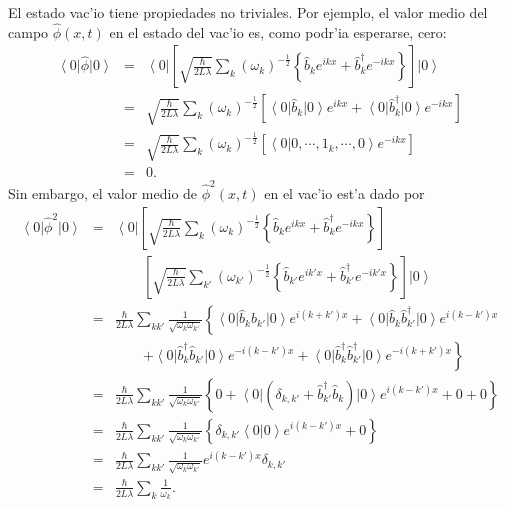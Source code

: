 El estado vac'io tiene propiedades no triviales. Por ejemplo, el valor medio del
campo $\hat{\phi}(x,t) $ en el estado del
vac'io es, como podr'ia esperarse, cero:
\begin{eqnarray}
\left< 0\right| \hat{\phi}\left| 0\right> & = &\left<
0\right| \left[ \sqrt{\frac{\hbar}{2L\lambda}}\sum_k\left( \omega
_k\right) ^{-\frac{1}{2}}\left\{ \hat{b}_k e^{ikx}+\hat{b}_k^\dagger  e^{-ikx}\right\} \right] \left|
0\right> \\
& = &\sqrt{\frac{\hbar}{2L\lambda}}\sum_k\left( \omega_k\right) ^{-\frac
{1}{2}}\left[ \left< 0\right| \hat{b}_k\left| 0\right> e^{ikx}+\left< 0\right|
\hat{b}_k^\dagger  \left| 0\right> e^{-ikx}\right] \\
& = &\sqrt{\frac{\hbar}{2L\lambda}}\sum_k\left( \omega_k\right) ^{-\frac
{1}{2}}\left[ \left< 0\right| \left. 0,\cdots, 1_k, \cdots,0\right> e^{-ikx}
\right] \\
& = &0 .
\end{eqnarray}
Sin embargo, el valor medio de $\hat{\phi}^{2}(x,t) $ en el vac'io est'a dado
por
\begin{eqnarray}
\left< 0\right| \hat{\phi}^{2}\left| 0\right> &=&
\left< 0\right| \left[ \sqrt{\frac{\hbar}{2L\lambda}}\sum_k\left(
\omega_k\right)^{-\frac{1}{2}}\left\{\hat{b}_ke^{ikx}
+\hat{b}_k^\dagger e^{-ikx}\right\} \right] \\
&& \qquad\left[ \sqrt{\frac{\hbar}{2L\lambda}}\sum_{k'}\left( \omega_{k'}\right)
^{-\frac{1}{2}}\left\{
\hat{b}_{k'}e^{ik'x}+\hat{b}_{k'}^\dagger e^{-ik'x}\right\} \right] \left|
0\right> \\
& = &\frac{\hbar}{2L\lambda}\sum_{kk'}\frac{1}{\sqrt{\omega_k\omega_{k'}}}
\left\{\left< 0\right| \hat{b}_k\hat{b}_{k'}\left| 0\right> e^{i\left(
k+k'\right) x}
+\left< 0\right| \hat{b}_k\hat{b}_{k'}^\dagger \left| 0\right>
e^{i(k-k')x}\right. \nonumber \\
&&\qquad\left.+\left< 0\right| \hat{b}_k^\dagger \hat{b}_{k'}\left| 0\right>
e^{-i(k-k')x}+\left< 0\right| \hat{b}_k^\dagger \hat{b}_{k'}^\dagger \left|
0\right> e^{-i\left( k+k'\right) x}\right\} \\
& =&\frac{\hbar}{2L\lambda}\sum_{kk'}\frac{1}{\sqrt{\omega_k\omega_{k'}}}\left\{
0+\left< 0\right| \left( \delta_{k,k'} +\hat{b}_{k'}^\dagger \hat{b}_k\right)
\left| 0\right> e^{i(k-k') x} +0+0\right\} \\
& =&\frac{\hbar}{2L\lambda}\sum_{kk'}\frac{1}{\sqrt{\omega_k\omega_{k'}}}\left\{
\delta_{k,k'} \left< 0\right| \left. 0\right> e^{i(k-k') x} +0\right\} \\
& =
&\frac{\hbar}{2L\lambda}\sum_{kk'}\frac{1}{\sqrt{\omega_k\omega_{k'}}}e^{
i(k-k') x}\delta_{k,k'} \\
& = &\frac{\hbar}{2L\lambda}\sum_k\frac{1}{\omega_k} .
\end{eqnarray}

